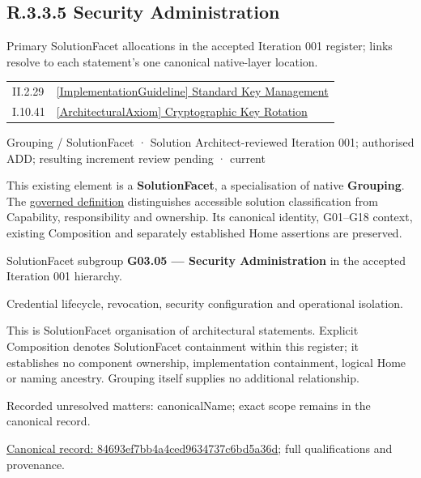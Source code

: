 \subsection*{R.3.3.5 Security Administration}
\label{navigation:R.3.3.5}

Primary SolutionFacet allocations in the accepted Iteration 001 register; links resolve to each statement’s one canonical native-layer location.\par
\begin{longtable}{p{.22\linewidth}p{.73\linewidth}}
II.2.29 & \hyperref[element:bbedb1ff13e94a88ac7ec60b8e40092e]{[ImplementationGuideline] Standard Key Management} \\
I.10.41 & \hyperref[element:6df99d4979a942fe833e1c43317b385b]{[ArchitecturalAxiom] Cryptographic Key Rotation} \\
\end{longtable}
\label{element:84693ef7bb4a4ced9634737c6bd5a36d}
{\small Grouping / SolutionFacet · Solution Architect-reviewed Iteration 001; authorised ADD; resulting increment review pending · current}\par

This existing element is a \textbf{SolutionFacet}, a specialisation of native
\textbf{Grouping}. The \href{\detokenize{../../../../../../../governance/continuum-representation.md#solutionfacet-classification--1119-candidate}}{governed definition}
distinguishes accessible solution classification from Capability, responsibility
and ownership. Its canonical identity, G01–G18 context, existing Composition
and separately established Home assertions are preserved.



SolutionFacet subgroup \textbf{G03.05 — Security Administration} in the accepted Iteration 001 hierarchy.



Credential lifecycle, revocation, security configuration and operational isolation.



This is SolutionFacet organisation of architectural statements. Explicit Composition denotes SolutionFacet containment within this register; it establishes no component ownership, implementation containment, logical Home or naming ancestry. Grouping itself supplies no additional relationship.


{\small Recorded unresolved matters: canonicalName; exact scope remains in the canonical record.}\par
{\footnotesize \href{../../../../../../../continuum/grouping/84693ef7bb4a4ced9634737c6bd5a36d.md}{Canonical record: 84693ef7bb4a4ced9634737c6bd5a36d}; full qualifications and provenance.}\par
